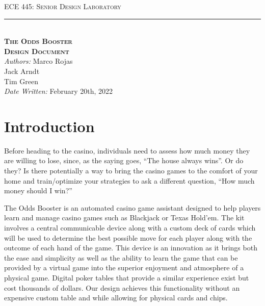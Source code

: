 \documentclass[12pt]{article}
\begin{document}
\begin{titlepage}
\begin{center}
{\LARGE \textsc{ECE 445: Senior Design Laboratory} \\ \vspace{8pt}}
\rule[13pt]{\textwidth}{1pt} \\ \vspace{120pt}
{\huge \textbf{\textsc{The Odds Booster}} \\ \vspace{8pt}}
{\LARGE \textbf{\textsc{Design Document}} \\ \vspace{30pt}} 
{\large \textit{Authors:} Marco Rojas \\ \vspace{4pt}
\hspace{48pt} Jack Arndt \\ \vspace{4pt}
\hspace{48pt} Tim Green \\ \vspace{4pt}
\hspace{8pt} \textit{Date Written:} February 20th, 2022}
\vfill
\end{center}

\end{titlepage}
\setcounter{page}{2}

\section{Introduction}

Before heading to the casino, individuals need to assess how much money they are willing to lose, since, as the saying goes, ``The house always wins''. Or do they? Is there potentially a way to bring the casino games to the comfort of your home and train/optimize your strategies to ask a different question, ``How much money should I win?''

The Odds Booster is an automated casino game assistant designed to help players learn and manage casino games such as Blackjack or Texas Hold'em. The kit involves a central communicable device along with a custom deck of cards which will be used to determine the best possible move for each player along with the outcome of each hand of the game. This device is an innovation as it brings both the ease and simplicity as well as the ability to learn the game that can be provided by a virtual game into the superior enjoyment and atmosphere of a physical game. Digital poker tables that provide a similar experience exist but cost thousands of dollars. Our design achieves this functionality without an expensive custom table and while allowing for physical cards and chips.
\end{document}
